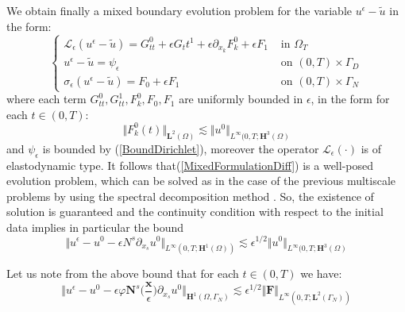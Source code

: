 We obtain finally a mixed boundary evolution problem for the variable $u^{\epsilon} - \tilde{u}$ in the form:
\begin{equation}
    \label{MixedFormulationDiff}
    \left \{
    \begin{aligned}
        \mathcal{L}_{\epsilon}(u^{\epsilon} - \tilde{u}) = G_{tt}^0 + \epsilon G_tt^1 + \epsilon \partial_{x_k} F_k^0 + \epsilon F_1   & \text{ in } \Omega_T \\
        u^{\epsilon}-\tilde{u} = \psi_{\epsilon} & \text{ on } (0,T)\times \Gamma_D\\
        \sigma_{\epsilon}(u^{\epsilon}-\tilde{u}) = F_0 + \epsilon F_1 & \text{ on } (0,T)\times\Gamma_N
    \end{aligned}
    \right .
\end{equation}
where each term $G_{tt}^0, G_{tt}^1, F_k^0, F_0, F_1$ are uniformly bounded in $\epsilon$, in the form for each $t \in (0,T)$:
\begin{equation*}
    \Vert F_k^0(t) \Vert_{\mathbf{L}^2(\Omega)} \lesssim \Vert u^0 \Vert_{L^{\infty}(0,T; \mathbf{H}^3(\Omega)}
\end{equation*}
and $\psi_{\epsilon}$ is bounded by (\ref{BoundDirichlet}), moreover the operator $\mathcal{L}_{\epsilon}(\cdot)$ is of elastodynamic type.
It follows that(\ref{MixedFormulationDiff}) is a well-posed evolution problem, which can be solved as in the case of the previous multiscale problems by using the spectral decomposition method \cite{raviart1983introduction}. So, the existence of solution is guaranteed and the continuity condition with respect to the initial data implies in particular the bound
\begin{equation*}
    \Vert u^{\epsilon} - u^0 - \epsilon N^s \partial_{x_s}u^0 \Vert_{L^{\infty}(0,T; \mathbf{H}^1(\Omega))} \lesssim \epsilon^{1/2} \Vert u^0 \Vert_{L^{\infty}(0,T; \mathbf{H}^3(\Omega)}
\end{equation*}


\begin{rem}
Let us note from the above bound that for each $t \in (0,T)$ we have:
\begin{equation}
    \label{TimeBound}
    \Vert u^{\epsilon} - u^0 - \epsilon \varphi \mathbf{N}^s\big( \frac{\mathbf{x}}{\epsilon} \big) \partial_{x_s} u^0 \Vert_{\mathbf{H}^1(\Omega, \Gamma_N)} \lesssim \epsilon^{1/2} \Vert \mathbf{F}\Vert_{L^{\infty}(0,T;\mathbf{L}^{2}(\Gamma_N))}
\end{equation}
\end{rem}
